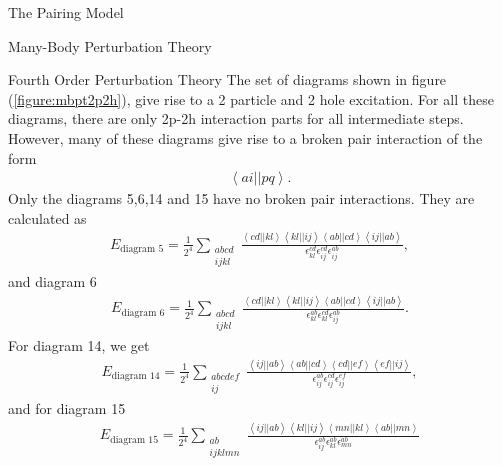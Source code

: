 \documentclass[twoside,english]{uiofysmaster}
\begin{document}
\begin{chapter}{The Pairing Model}
\begin{section}{Many-Body Perturbation Theory}
\begin{subsection}{Fourth Order Perturbation Theory}
			The set of diagrams shown in figure (\ref{figure:mbpt2p2h}), give rise to a 2 particle and 2 hole excitation. For all these diagrams, there are only 2p-2h interaction parts for all intermediate steps. However, many of these diagrams give rise to a broken pair interaction of the form 
			\begin{align}
			 	\left< ai || pq \right> .
			\end{align}
			Only the diagrams 5,6,14 and 15 have no broken pair interactions. They are calculated as
			\begin{align}
				E_{\text{diagram 5}} = \frac{1}{2^4} \sum_{\substack{abcd\\ijkl}} \frac{ \left<cd||kl\right>\left<kl||ij\right>\left<ab||cd\right>\left<ij||ab\right> }{ \epsilon_{kl}^{cd} \epsilon_{ij}^{cd} \epsilon_{ij}^{ab} },
			\end{align} 
			and diagram 6
			\begin{align}
				E_{\text{diagram 6}} = \frac{1}{2^4} \sum_{\substack{abcd\\ijkl}} \frac{ \left<cd||kl\right>\left<kl||ij\right>\left<ab||cd\right>\left<ij||ab\right> }{ \epsilon_{kl}^{ab} \epsilon_{kl}^{cd} \epsilon_{ij}^{ab} }.
			\end{align} 
			For diagram 14, we get 
			\begin{align}
				E_{\text{diagram 14}} = \frac{1}{2^4} \sum_{\substack{abcdef\\ij}} \frac{ \left<ij||ab\right>\left<ab||cd\right>\left<cd||ef\right>\left<ef||ij\right> }{ \epsilon_{ij}^{ab} \epsilon_{ij}^{cd} \epsilon_{ij}^{ef} },
			\end{align} 
			and for diagram 15
			\begin{align}
				E_{\text{diagram 15}} = \frac{1}{2^4} \sum_{\substack{ab\\ijklmn}} \frac{ \left<ij||ab\right>\left<kl||ij\right>\left<mn||kl\right>\left<ab||mn\right> }{ \epsilon_{ij}^{ab} \epsilon_{kl}^{ab} \epsilon_{mn}^{ab} }
			\end{align} 


\end{subsection}
\end{section}
\end{chapter}
\end{document}
